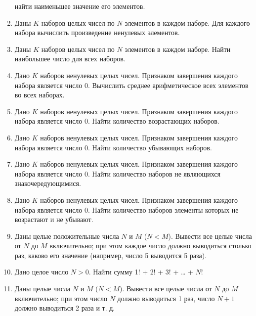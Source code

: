 \begin{enumerate}
найти наименьшее значение его элементов.
\item Даны $K$ наборов целых чисел по $N$ элементов в каждом наборе. Для каждого набора вычислить произведение ненулевых
элементов.
\item Даны $K$ наборов целых чисел по $N$ элементов в каждом наборе. Найти наибольшее число для всех наборов.
\item Дано $K$ наборов ненулевых целых чисел. Признаком завершения каждого набора является число 0. Вычислить среднее
арифметическое всех элементов во всех наборах.
\item Дано $K$ наборов ненулевых целых чисел. Признаком завершения каждого набора является число 0. Найти количество
возрастающих наборов.
\item Дано $K$ наборов ненулевых целых чисел. Признаком завершения каждого набора является число 0. Найти количество
убывающих наборов.
\item Дано $K$ наборов ненулевых целых чисел. Признаком завершения каждого набора является число 0. Найти количество
наборов не являющихся знакочередующимися.
\item Дано $K$ наборов ненулевых целых чисел. Признаком завершения каждого набора является число 0. Найти количество
наборов элементы которых не возрастают и не убывают.
\item Даны целые положительные числа $N$ и $M$ ($N<M$). Вывести все целые числа от $N$ до $M$ включительно; при этом
каждое число должно выводиться столько раз, каково его значение (например, число 5 выводится 5 раза).
\item Дано целое число $N>0$. Найти сумму 1! + 2! + 3! + … + $N$!
\item Даны целые числа $N$ и $M$ ($N<M$). Вывести все целые числа от $N$ до $M$ включительно; при этом число $N$ должно
выводиться 1 раз, число $N + 1$ должно выводиться 2 раза и т. д.
\end{enumerate}
